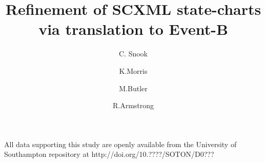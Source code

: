 \documentclass[runningheads,a4paper]{llncs}
\begin{document}
\mainmatter  %

\title{Refinement of SCXML state-charts via translation to Event-B}


%
\author{C. Snook  %
\and K.Morris     
\and M.Butler     
\and R.Armstrong 
}




\maketitle

\resetabbrev


















\begin{footnotesize} %
\vspace{10 pt}
\par
\noindent
All data supporting this study are openly available from the University of Southampton repository at
http://doi.org/10.????/SOTON/D0???\\   %
\end{footnotesize} %




\end{document}
